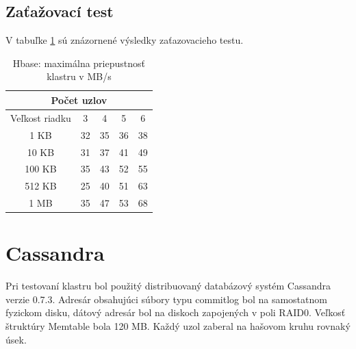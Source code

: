 \documentclass[11pt,twoside,a4paper]{book}
\begin{document}
\subsection*{Zaťažovací test}

V tabuľke \ref{tab:HPerf3} sú znázornené výsledky zaťazovacieho testu.

\begin{table}[htp]
\begin{center}
\begin{tabular}{|c|c|c|c|c|}
\hline
\multicolumn{5}{|c|}{Počet uzlov}  \\
\hline Veľkost riadku & 3 & 4 & 5 & 6\\ 
\hline
\hline 1 KB & 32 & 35 & 36 & 38\\ 
\hline 10 KB & 31 & 37 & 41 & 49 \\ 
\hline 100 KB & 35 & 43 & 52 & 55\\ 
\hline 512 KB & 25 & 40 & 51 & 63 \\  
\hline 1 MB & 35 & 47 & 53 & 68 \\ 
\hline
\end{tabular} 
\end{center}
\caption{Hbase: maximálna priepustnosť klastru v MB/s}
\label{tab:HPerf3}
\end{table}



\section{Cassandra}

Pri testovaní klastru bol použitý distribuovaný databázový systém Cassandra verzie 0.7.3. Adresár obsahujúci súbory typu commitlog bol na samostatnom fyzickom disku, dátový adresár bol na diskoch zapojených v poli RAID0. Veľkosť štruktúry Memtable bola 120 MB. Každý uzol zaberal na hašovom kruhu rovnaký úsek.
\end{document}
